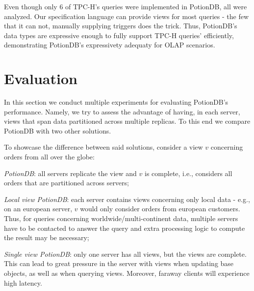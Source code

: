 \documentclass{vldb}
\begin{document}
Even though only 6 of TPC-H’s queries were implemented in PotionDB, all were analyzed.
Our specification language can provide views for most queries - the few that it can not, manually supplying triggers does the trick.
Thus, PotionDB's data types are expressive enough to fully support TPC-H queries' efficiently, demonstrating PotionDB's expressivety adequaty for OLAP scenarios. %

\section{Evaluation}
\label{sec:evaluation}

In this section we conduct multiple experiments for evaluating PotionDB's performance.
Namely, we try to assess the advantage of having, in each server, views that span data partitioned across multiple replicas.
To this end we compare PotionDB with two other solutions.

To showcase the difference between said solutions, consider a view $v$ concerning orders from all over the globe:

\begin{compactitem}
	\item \emph{PotionDB}: all servers replicate the view and $v$ is complete, i.e., considers all orders that are partitioned across servers;
	\item \emph{Local view PotionDB}: each server contains views concerning only local data - e.g., on an european server, $v$ would only consider orders from european customers.
	Thus, for queries concerning worldwide/multi-continent data, multiple servers have to be contacted to answer the query and extra processing logic to compute the result may be necessary;
	\item \emph{Single view PotionDB}: only one server has all views, but the views are complete.
	This can lead to great pressure in the server with views when updating base objects, as well as when querying views.
	Moreover, faraway clients will experience high latency.
\end{compactitem}
\end{document}
